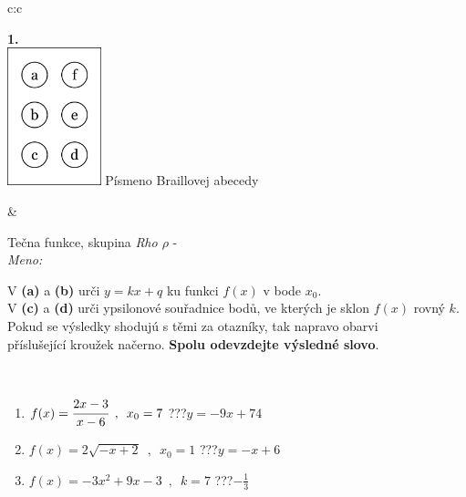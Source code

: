 \documentclass[10pt]{report}
\begin{document}
\begin{tabular}{c:c}
\begin{minipage}[c][104.5mm][t]{0.5\linewidth}
\begin{center}
\begin{minipage}{0.20\linewidth}
\begin{center}
{\Huge\bfseries 1.} \\[2mm]
\includegraphics[height=40mm]{../images/braille.png}
{\small Písmeno Braillovej abecedy}
\end{center}
\end{minipage}
\end{center}
\end{minipage}
&
\begin{minipage}[c][104.5mm][t]{0.5\linewidth}
\begin{center}
\vspace{7mm}
{\huge Tečna funkce, skupina \textit{Rho $\rho$} -}\\[5mm]
\textit{Meno:}\phantom{xxxxxxxxxxxxxxxxxxxxxxxxxxxxxxxxxxxxxxxxxxxxxxxxxxxxxxxxxxxxxxxxx}\\[5mm]
\begin{minipage}{0.95\linewidth}
\begin{center}
V \textbf{(a)} a \textbf{(b)} urči  $y = kx + q$ ku funkci $f(x)$ v bode $x_0$.\\V \textbf{(c)} a \textbf{(d)} urči ypsilonové souřadnice bodů, ve kterých je sklon $f(x)$ rovný $k$.\\Pokud se výsledky shodujú s těmi za otazníky, tak napravo obarvi\\příslušející kroužek načerno. \textbf{Spolu odevzdejte výsledné slovo}.
\end{center}
\end{minipage}
\\[1mm]
\begin{minipage}{0.79\linewidth}
\begin{center}
\begin{varwidth}{\linewidth}
\begin{enumerate}
\small
\item $f(x)=\cfrac{2x-3}{x-6}\enspace , \enspace x_0=7$\quad \dotfill\; ???\;\dotfill \quad $y = -9x+74$
\item $f(x)=2\sqrt{-x+2}\enspace , \enspace x_0=1$\quad \dotfill\; ???\;\dotfill \quad $y = -x+6$
\item $f(x)=-3x^2+9x-3\enspace , \enspace k=7$\quad \dotfill\; ???\;\dotfill \quad $-\frac{1}{3}$

\end{enumerate}
\end{varwidth}
\end{center}
\end{minipage}
\end{center}
\end{minipage}
\end{tabular}
\end{document}
